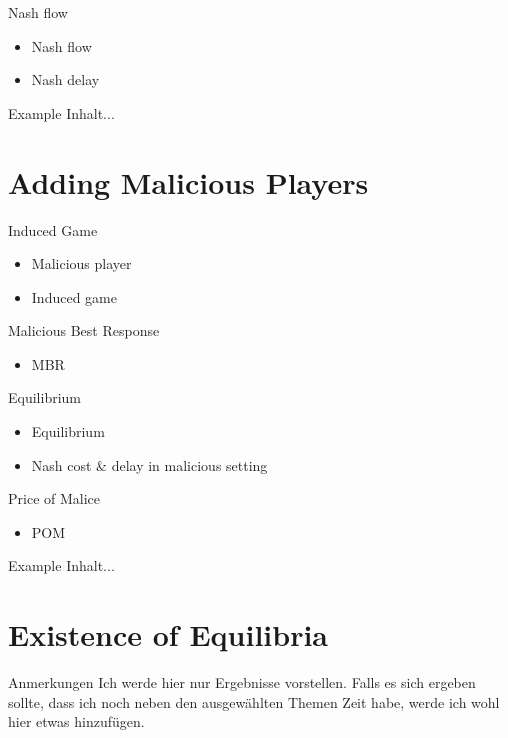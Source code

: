 \documentclass{beamer}
\begin{document}
\begin{frame}{Nash flow}
	\begin{itemize}
		\item Nash flow
		\item Nash delay
	\end{itemize}
\end{frame}

\begin{frame}{Example}
	Inhalt...
\end{frame}


\section{Adding Malicious Players}
\begin{frame}{Induced Game}
	\begin{itemize}
		\item Malicious player
		\item Induced game
	\end{itemize}
\end{frame}

\begin{frame}{Malicious Best Response}
	\begin{itemize}
		\item MBR
	\end{itemize}
\end{frame}

\begin{frame}{Equilibrium}
	\begin{itemize}
		\item Equilibrium
		\item Nash cost \& delay in malicious setting
	\end{itemize}
\end{frame}

\begin{frame}{Price of Malice}
	\begin{itemize}
		\item POM 
	\end{itemize}
\end{frame}

\begin{frame}{Example}
	Inhalt...
\end{frame}


\section{Existence of Equilibria}
\begin{frame}{Anmerkungen}
	Ich werde hier nur Ergebnisse vorstellen.
	Falls es sich ergeben sollte, dass ich noch neben den ausgewählten Themen Zeit habe, werde ich wohl hier etwas hinzufügen.
\end{frame}
\end{document}
